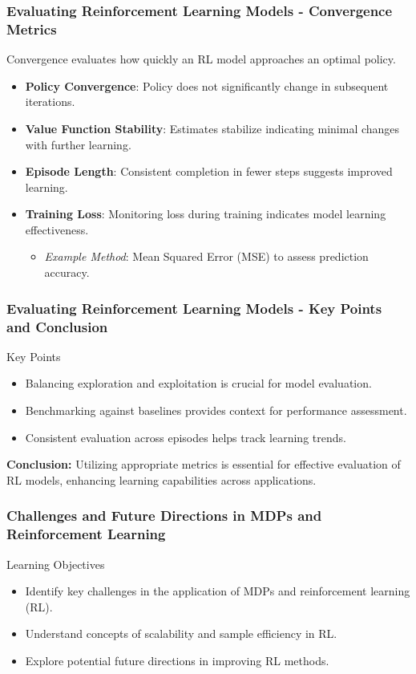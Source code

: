 \documentclass[aspectratio=169]{beamer}
\begin{document}
\begin{frame}[fragile]
    \frametitle{Evaluating Reinforcement Learning Models - Convergence Metrics}
    Convergence evaluates how quickly an RL model approaches an optimal policy.
    \begin{itemize}
        \item \textbf{Policy Convergence}: Policy does not significantly change in subsequent iterations.
        \item \textbf{Value Function Stability}: Estimates stabilize indicating minimal changes with further learning.
        \item \textbf{Episode Length}: Consistent completion in fewer steps suggests improved learning.
        \item \textbf{Training Loss}: Monitoring loss during training indicates model learning effectiveness. 
        \begin{itemize}
            \item \textit{Example Method}: Mean Squared Error (MSE) to assess prediction accuracy.
        \end{itemize}
    \end{itemize}
\end{frame}

\begin{frame}[fragile]
    \frametitle{Evaluating Reinforcement Learning Models - Key Points and Conclusion}
    \begin{block}{Key Points}
        \begin{itemize}
            \item Balancing exploration and exploitation is crucial for model evaluation.
            \item Benchmarking against baselines provides context for performance assessment.
            \item Consistent evaluation across episodes helps track learning trends.
        \end{itemize}
    \end{block}
    
    \textbf{Conclusion:} Utilizing appropriate metrics is essential for effective evaluation of RL models, enhancing learning capabilities across applications.
\end{frame}

\begin{frame}[fragile]
    \frametitle{Challenges and Future Directions in MDPs and Reinforcement Learning}
    \begin{block}{Learning Objectives}
        \begin{itemize}
            \item Identify key challenges in the application of MDPs and reinforcement learning (RL).
            \item Understand concepts of scalability and sample efficiency in RL.
            \item Explore potential future directions in improving RL methods.
        \end{itemize}
    \end{block}
\end{frame}
\end{document}
